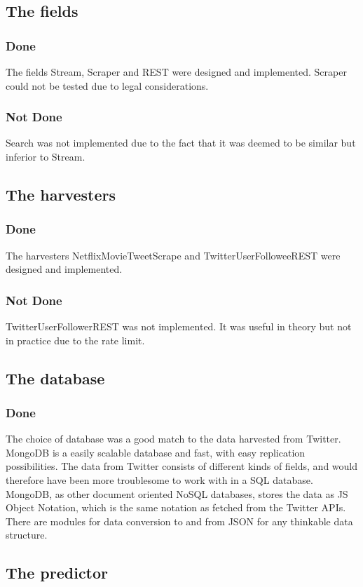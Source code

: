 \subsection{The fields}
\subsubsection{Done}
The fields Stream, Scraper and REST were designed and implemented. Scraper could not be tested due to legal considerations.
\subsubsection{Not Done}
Search was not implemented due to the fact that it was deemed to be similar but inferior to Stream.

\subsection{The harvesters}
\subsubsection{Done}
The harvesters NetflixMovieTweetScrape
and TwitterUserFolloweeREST were designed and implemented.
\subsubsection{Not Done}
TwitterUserFollowerREST was not implemented. It was useful in theory but not in practice due to the rate limit.

\subsection{The database}
\subsubsection{Done}
The choice of database was a good match to the data harvested from Twitter. MongoDB is a easily scalable database and fast, with easy replication possibilities. The data from Twitter consists of different kinds of fields, and would therefore have been more troublesome to work with in a SQL database. MongoDB, as other document oriented NoSQL databases, stores the data as JS Object Notation, which is the same notation as fetched from the Twitter APIs. There are modules for data conversion to and from JSON for any thinkable data structure.


\subsection{The predictor}
